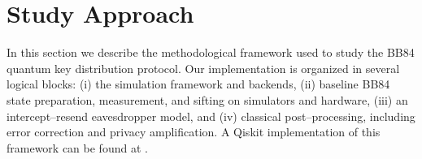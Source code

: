 \section{Study Approach} \label{sec:study-approach}

In this section we describe the methodological framework used to study the BB84 quantum key distribution protocol. Our implementation is organized in several logical blocks: (i) the simulation framework and backends, (ii) baseline BB84 state preparation, measurement, and sifting on simulators and hardware, (iii) an intercept--resend eavesdropper model, and (iv) classical post--processing, including error correction and privacy amplification. 
A Qiskit implementation of this framework can be found at \cite{bb84_project_2026}.

\label{subsec:study-framework}


\label{subsec:study-baseline-bb84}


\label{subsec:study-eavesdropper}


\label{subsec:study-postprocessing}

